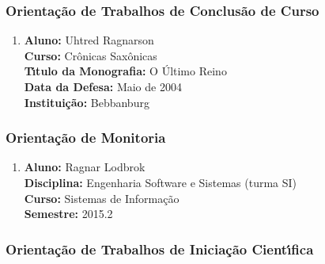 \documentclass[a4paper,oneside,10pt]{article}
\begin{document}

\subsubsection{Orienta\c{c}\~{a}o de Trabalhos de Conclus\~{a}o de Curso}
\vspace{0.3cm}

\begin{enumerate}
\renewcommand{\labelenumi}{{\large\bfseries\arabic{enumi}.}}

\item       \textbf{Aluno:} Uhtred Ragnarson \mbox{}\\
            \textbf{Curso:} Crônicas Saxônicas\\
            \textbf{T\'{\i}tulo da Monografia:} O Último Reino\\
            \textbf{Data da Defesa:} Maio de 2004\\
            \textbf{Institui\c{c}\~{a}o:} Bebbanburg

\end{enumerate}


\subsubsection{Orienta\c{c}\~{a}o de Monitoria}
\vspace{0.3cm}

\begin{enumerate}
\renewcommand{\labelenumi}{{\large\bfseries\arabic{enumi}.}}

\item   \textbf{Aluno:} Ragnar Lodbrok \mbox{} \\
        \textbf{Disciplina:}  Engenharia Software e Sistemas (turma SI)\\
        \textbf{Curso:} Sistemas de Informação\\
        \textbf{Semestre:} 2015.2

\end{enumerate}


\subsubsection{Orienta\c{c}\~{a}o de Trabalhos de Inicia\c{c}\~{a}o Cient\'{\i}fica}
\vspace{0.3cm}
\end{document}
